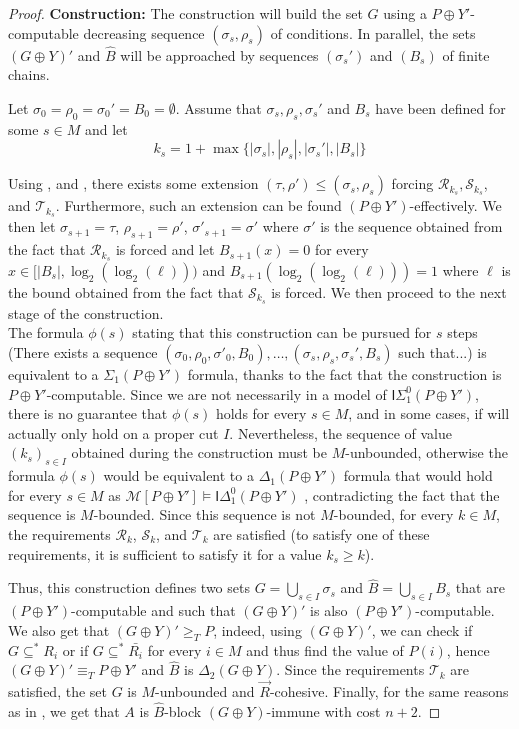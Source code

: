 \documentclass{article}
\def\R{\mathcal{R}}
\def\M{\mathcal{M}}
\def\T{\mathcal{T}}
\def\S{\mathcal{S}}
\newcommand{\ISig}{\mathsf{I}\Sigma^0}
\newcommand{\IDelta}{\mathsf{I}\Delta^0}
\numberwithin{theorem}{section}
\begin{document}
\begin{proof}
\textbf{Construction:} The construction will build the set $G$ using a $P \oplus Y'$-computable decreasing sequence $(\sigma_s, \rho_s)$ of conditions. In parallel, the sets $(G \oplus Y)'$ and $\hat{B}$ will be approached by sequences $(\sigma_s')$ and $(B_s)$ of finite chains.

Let $\sigma_0 = \rho_0 = \sigma_0' = B_0 = \emptyset$. Assume that $\sigma_s, \rho_s, \sigma_s'$ and $B_s$ have been defined for some $s \in M$ and let $$k_s = 1 + \max \{|\sigma_s|, |\rho_s|, |\sigma_s'|, |B_s|\}$$

Using ,  and , there exists some extension $(\tau, \rho') \leq (\sigma_s, \rho_s)$ forcing $\R_{k_s}, \S_{k_s}$, and $\T_{k_s}$. Furthermore, such an extension can be found $(P \oplus Y')$-effectively. We then let $\sigma_{s+1} = \tau$, $\rho_{s+1} = \rho'$, $\sigma'_{s+1} = \sigma'$ where $\sigma'$ is the sequence obtained from the fact that $\R_{k_s}$ is forced and let $B_{s+1}(x) = 0$ for every $x \in [|B_s|, \log_2(\log_2(\ell)))$ and $B_{s+1}(\log_2(\log_2(\ell))) = 1$ where $\ell$ is the bound obtained from the fact that $\S_{k_s}$ is forced. We then proceed to the next stage of the construction. \\

The formula $\phi(s)$ stating that this construction can be pursued for $s$ steps (There exists a sequence $(\sigma_0, \rho_0, \sigma'_0,B_0),\dots, (\sigma_s, \rho_s, \sigma_s',B_s)$ such that...) is equivalent to a $\Sigma_1(P \oplus Y')$ formula, thanks to the fact that the construction is $P \oplus Y'$-computable. Since we are not necessarily in a model of $\ISig_1(P \oplus Y')$, there is no guarantee that $\phi(s)$ holds for every $s \in M$, and in some cases, if will actually only hold on a proper cut $I$. Nevertheless, the sequence of value $(k_s)_{s \in I}$ obtained during the construction must be $M$-unbounded, otherwise the formula $\phi(s)$ would be equivalent to a $\Delta_1(P \oplus Y')$ formula that would hold for every $s \in M$ as $\M[P \oplus Y'] \models \IDelta_1(P \oplus Y')$ , contradicting the fact that the sequence is $M$-bounded. Since this sequence is not $M$-bounded, for every $k \in M$, the requirements $\R_k$, $\S_k$, and $\T_k$ are satisfied (to satisfy one of these requirements, it is sufficient to satisfy it for a value $k_s \geq k$).


Thus, this construction defines two sets $G = \bigcup_{s \in I} \sigma_s$ and $\hat{B} = \bigcup_{s \in I} B_s$ that are $(P \oplus Y')$-computable and such that $(G \oplus Y)'$ is also $(P \oplus Y')$-computable. We also get that $(G \oplus Y)' \geq_T P$, indeed, using $(G \oplus Y)'$, we can check if $G \subseteq^* R_i$ or if $G \subseteq^* \bar{R_i}$ for every $i \in M$ and thus find the value of $P(i)$, hence $(G \oplus Y)' \equiv_T P \oplus Y'$ and $\hat{B}$ is $\Delta_2(G \oplus Y)$. Since the requirements $\T_k$ are satisfied, the set $G$ is $M$-unbounded and $\vec{R}$-cohesive. Finally, for the same reasons as in , we get that $A$ is $\hat{B}$-block $(G \oplus Y)$-immune with cost $n+2$.
\end{proof}
\end{document}

